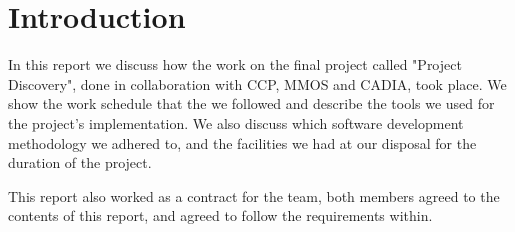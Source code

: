 \section{Introduction}\label{sec:introduction}
In this report we discuss how the work on the final project called "Project Discovery", done in collaboration with CCP, MMOS and CADIA, took place. We show the work schedule that the we followed and describe the tools we used for the project's implementation. We also discuss which software development methodology we adhered to, and the facilities we had at our disposal for the duration of the project. 

This report also worked as a contract for the team, both members agreed to the contents of this report, and agreed to follow the requirements within.